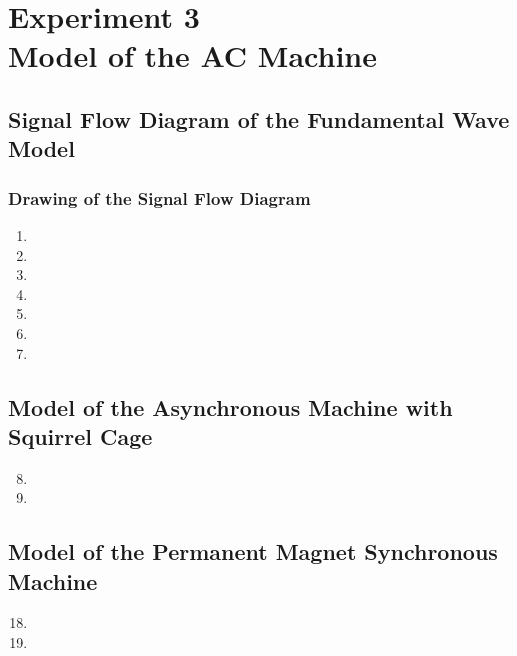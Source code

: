 \documentclass[12pt,a4paper, openany]{book}
\begin{document}




\setcounter{chapter}{2} %
\chapter{Experiment 3 \\  Model of the AC Machine}

 \setcounter{section}{7} %
\section{Signal Flow Diagram of the Fundamental Wave Model}
\subsection{Drawing of the Signal Flow Diagram}
\begin{enumerate}
\item 
\item 
\item 
\item 
\item 
\item 
\item 
\end{enumerate}
\section{ Model of the Asynchronous Machine with Squirrel Cage}
\begin{enumerate}
\setcounter{enumi}{7} %
\item
\item
\end{enumerate}
\section{Model of the Permanent Magnet Synchronous Machine}
\begin{enumerate}
    \setcounter{enumi}{17}
    \item 
    \item
\end{enumerate}
\end{document}
